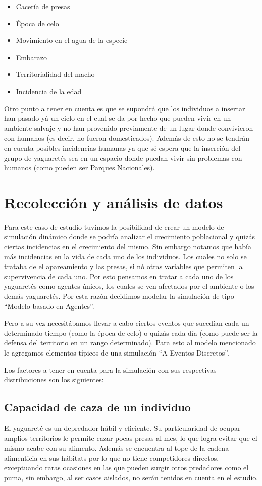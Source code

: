     \begin{itemize}
        \item Cacería de presas
        \item Época de celo
        \item Movimiento en el agua de la especie
        \item Embarazo
        \item Territorialidad del macho
        \item Incidencia de la edad
    \end{itemize}

    Otro punto a tener en cuenta es que se supondrá que los individuos a insertar han pasado yá un ciclo en el cual se da por hecho que pueden vivir en un ambiente salvaje y no han provenido previamente de un lugar donde convivieron con humanos (es decir, no fueron domesticados).
    Además de esto no se tendrán en cuenta posibles incidencias humanas ya que sé espera que la inserción del grupo de yaguaretés sea en un espacio donde puedan vivir sin problemas con humanos (como pueden ser Parques Nacionales).

\section{Recolección y análisis de datos}
    Para este caso de estudio tuvimos la posibilidad de crear un modelo de simulación dinámico donde se podría analizar
    el crecimiento poblacional y quizás ciertas incidencias en el crecimiento del mismo. Sin embargo notamos que había
    más incidencias en la vida de cada uno de los individuos. Los cuales no solo se trataba de el apareamiento y las
    presas, si nó otras variables que permiten la supervivencia de cada uno. Por esto pensamos en tratar a cada uno de
    los yaguaretés como agentes únicos, los cuales se ven afectados por el ambiente o los demás yaguaretés. Por esta
    razón decidimos modelar la simulación de tipo ``Modelo basado en Agentes''.

    Pero a su vez necesitábamos llevar a cabo ciertos eventos que sucedían cada un determinado tiempo (como la época de
celo) o quizás cada día (como puede ser la defensa del territorio en un rango determinado). Para esto al modelo
mencionado le agregamos elementos típicos de una simulación ``A Eventos Discretos''.

    Los factores a tener en cuenta para la simulación con sus respectivas distribuciones son los siguientes:
    
   \subsection{Capacidad de caza de un individuo}
    El yaguareté es un depredador hábil y eficiente. Su particularidad de ocupar amplios territorios le permite cazar pocas presas al mes, lo que logra evitar que el mismo acabe con su alimento. Además se encuentra al tope de la cadena alimenticia en sus hábitats por lo que no tiene competidores directos, exceptuando raras ocasiones en las que pueden surgir otros predadores como el puma, sin embargo, al ser casos aislados, no serán tenidos en cuenta en el estudio.
    
